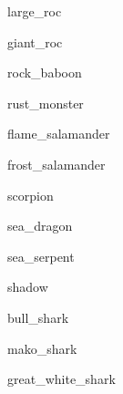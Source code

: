 \documentclass[letterpaper,serif]{module}
\begin{document}
\begin{newmonster}{large_roc}\end{newmonster}

\begin{newmonster}{giant_roc}\end{newmonster}

\begin{newmonster}{rock_baboon}\end{newmonster}

\begin{newmonster}{rust_monster}\end{newmonster}


\begin{newmonster}{flame_salamander}\end{newmonster}

\begin{newmonster}{frost_salamander}\end{newmonster}

\begin{newmonster}{scorpion}\end{newmonster}

\begin{newmonster}{sea_dragon}\end{newmonster}

\begin{newmonster}{sea_serpent}\end{newmonster}

\begin{newmonster}{shadow}\end{newmonster}


\begin{newmonster}{bull_shark}\end{newmonster}

\begin{newmonster}{mako_shark}\end{newmonster}

\begin{newmonster}{great_white_shark}\end{newmonster}
\end{document}
